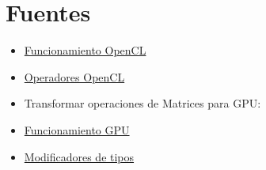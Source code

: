 \documentclass[12pt,a4paper]{article}
\begin{document}
\section{Fuentes}
\begin{itemize}
\item \href{https://www.khronos.org/assets/uploads/developers/library/overview/opencl_overview.pdf}{ Funcionamiento OpenCL}
\item \href{https://www.khronos.org/registry/cl/sdk/2.0/docs/man/xhtml/operators.html}{Operadores OpenCL}
\item Transformar operaciones de Matrices para GPU:
\item \href{https://www.khronos.org/assets/uploads/developers/library/overview/opencl_overview.pdf#page=8}{Funcionamiento GPU}
\item \href{https://www.khronos.org/registry/cl/specs/opencl-2.0-openclc.pdf#page=51}{Modificadores de tipos}
\end{itemize}
\end{document}
